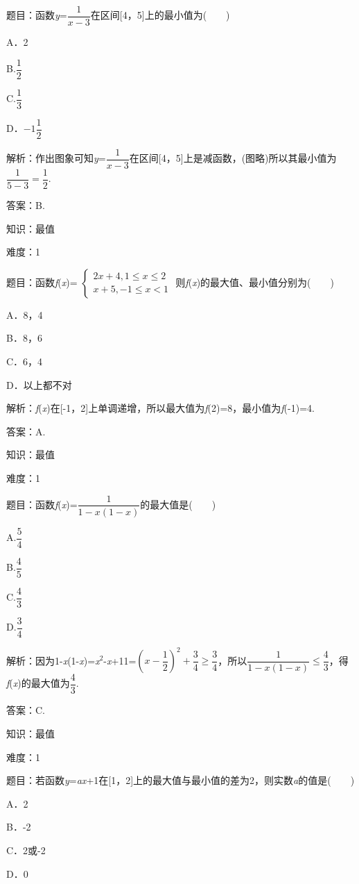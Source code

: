 \documentclass{article} %
\begin{document}
题目：函数\textit{y}=$\dfrac{1}{x-3}$在区间[4，5]上的最小值为(　　)

A．2　　　　　　　　 

B.$\dfrac{1}{2}$

C.$\dfrac{1}{3}$  
 
D．$-1\dfrac{1}{2}$

解析：作出图象可知\textit{y}=$\dfrac{1}{x-3}$在区间[4，5]上是减函数，(图略)所以其最小值为$\dfrac{1}{5-3}=\dfrac{1}{2}$.

答案：B.

知识：最值

难度：1

题目：函数\textit{f}(\textit{x})=
$\left\{
\begin{array}{l}
	2x+4, 1\le x \le 2 \\
	x+5, -1\le x <1
\end{array}
\right.$
则\textit{f}(\textit{x})的最大值、最小值分别为(　　)

A．8，4  

B．8，6

C．6，4  

D．以上都不对

解析：\textit{f}(\textit{x})在[-1，2]上单调递增，所以最大值为\textit{f}(2)=8，最小值为\textit{f}(-1)=4.

答案：A.

知识：最值

难度：1

题目：函数\textit{f}(\textit{x})=$\dfrac{1}{1-x(1-x)}$的最大值是(　　)

A.$\dfrac{5}{4}$

B.$\dfrac{4}{5}$

C.$\dfrac{4}{3}$   

D.$\dfrac{3}{4}$

解析：因为1-\textit{x}(1-\textit{x})=\textit{x}${}^{2}$-\textit{x}+11=$(x-\dfrac{1}{2})^{2}+\dfrac{3}{4}$$\mathrm{\ge}$$\dfrac{3}{4}$，所以$\dfrac{1}{1-x(1-x)}$$\mathrm{\le}$$\dfrac{4}{3}$，得\textit{f}(\textit{x})的最大值为$\dfrac{4}{3}$.

答案：C.

知识：最值

难度：1

题目：若函数\textit{y}=\textit{ax}+1在[1，2]上的最大值与最小值的差为2，则实数\textit{a}的值是(　　)

A．2   

B．-2

C．2或-2  

D．0
\end{document}

